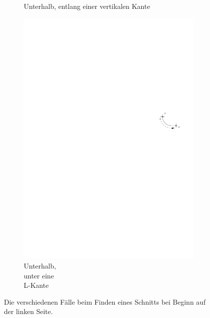 \documentclass[a4paper]{scrreprt}
\theoremstyle{definition}
\begin{document}
\begin{figure}[h]
\begin{subfigure}[b]{0.2\textwidth}
                \caption{Unterhalb, entlang einer vertikalen Kante}
                \label{fig:cutfinding_bot_vertical}
        \end{subfigure}
        \quad
        \begin{subfigure}[b]{0.2\textwidth}
                \includegraphics[width=\textwidth]{schnitt_finden/bot_belowL}
                \caption{Unterhalb, \\ unter eine \\ L-Kante}
                \label{fig:cutfinding_bot_belowL}
        \end{subfigure}
        \caption{Die verschiedenen Fälle beim Finden eines Schnitts bei Beginn auf der linken Seite.}\label{fig:cutfinding}
\end{figure}
\end{document}
